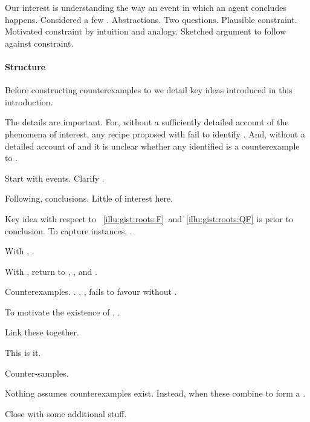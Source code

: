 \begin{note}
  Our interest is understanding the way an event in which an agent concludes happens.
  Considered a few .
  Abstractions.
  Two questions.
  Plausible constraint.
  Motivated constraint by intuition and analogy.
  Sketched argument to follow against constraint.
\end{note}


\newpage

\paragraph*{Structure}


\begin{note}
  Before constructing counterexamples to \issueInclusion{} we detail key ideas introduced in this introduction.

  The details are important.
  For, without a sufficiently detailed account of the phenomena of interest, any recipe proposed with fail to identify .
  And, without a detailed account of \qWhy{} and \qHow{} it is unclear whether any identified  is a counterexample to \issueInclusion{}.

  Start with events.
  Clarify \qWhy{}.

  Following, conclusions.
  Little of interest here.

  Key idea with respect to ~\ref{illu:gist:roots:F}~and~\ref{illu:gist:roots:QF} is \ros{} prior to conclusion.
  To capture instances, .

  With , .

  With , return to \qWhy{}, \qHow{}, and \issueInclusion{}.

  Counterexamples.
  .
  , , fails to favour without .

  To motivate the existence of , \tC{}.

  Link these together.

  This is it.

  Counter-samples.

  Nothing assumes counterexamples exist.
  Instead, when these combine to form a \scen{}.

  Close with some additional stuff.
\end{note}



